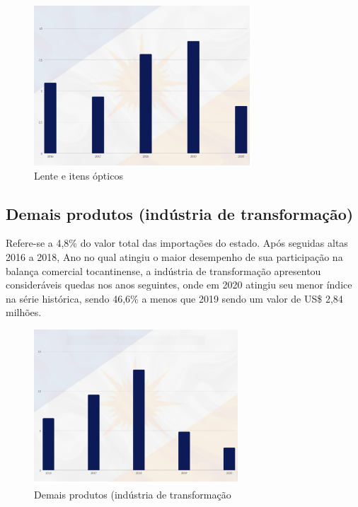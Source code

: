 \begin{figure} [h] \caption{Lente e itens ópticos}
	\includegraphics[width=\linewidth]{fig/lentes1.png}
\end{figure}

\newpage 

\subsection {Demais produtos (indústria de transformação)}
\par Refere-se a 4,8\% do valor total das importações do estado. Após seguidas altas 2016 a 2018, Ano no qual atingiu o maior desempenho de sua participação na balança comercial tocantinense, a indústria de transformação apresentou consideráveis quedas nos anos seguintes, onde em 2020 atingiu seu menor índice na série histórica, sendo 46,6\% a menos que 2019 sendo um valor de US\$ 2,84 milhões. 

\begin{figure} [h] \caption{Demais produtos (indústria de transformação}
	\includegraphics[width=\linewidth]{fig/outros1.png}
\end{figure}

